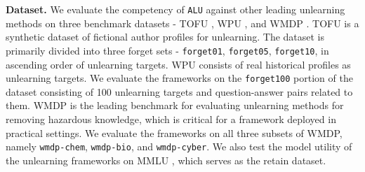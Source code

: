 \textbf{Dataset.} We evaluate the competency of \texttt{ALU} against other leading unlearning methods on three benchmark datasets - TOFU \cite{maini2024tofu}, WPU \cite{liu2024revisitingwhosharrypotter}, and WMDP \cite{li2024wmdpbenchmarkmeasuringreducing}. TOFU is a synthetic dataset of fictional author profiles for unlearning. The dataset is primarily divided into three forget sets - \verb|forget01|, \verb|forget05|, \verb|forget10|, in ascending order of unlearning targets. WPU consists of real historical profiles as unlearning targets. We evaluate the frameworks on the \verb|forget100| portion of the dataset consisting of 100 unlearning targets and question-answer pairs related to them. WMDP is the leading benchmark for evaluating unlearning methods for removing hazardous knowledge, which is critical for a framework deployed in practical settings. We evaluate the frameworks on all three subsets of WMDP, namely \verb|wmdp-chem|, \verb|wmdp-bio|, and \verb|wmdp-cyber|. We also test the model utility of the unlearning frameworks on MMLU \cite{hendrycks2021measuringmassivemultitasklanguage}, which serves as the retain dataset.


